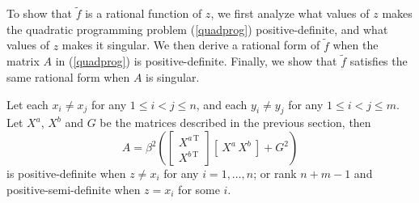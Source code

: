To show that $\tilde f$ is a rational function of $z$, we first analyze
what values of $z$ makes the quadratic programming problem (\ref{quadprog})
positive-definite, and what values of $z$ makes it singular.  We then derive a
rational form of $\tilde f$ when the matrix $A$ in (\ref{quadprog}) is
positive-definite.  Finally, we show that $\tilde f$ satisfies the same
rational form when $A$ is singular.
\begin{lemma} \label{lem_pd}
Let each $x_i \ne x_j$ for any $1\le i < j\le n$, and each $y_i \ne y_j$ for
any $1\le i < j\le m$.  Let
$X^a$, $X^b$ and $G$ be the matrices described in the previous section, then
\[ A = \beta^2 \left(
   \left[\begin{array}{c}X^{a\,\mathrm T}\\X^{b\,\mathrm T}\end{array}\right]
   \left[\: X^a\,X^b \:\right] + G^2 \right) \]
is positive-definite when $z\ne x_i$ for any $i=1,\ldots,n$; or rank $n+m-1$
and positive-semi-definite when $z = x_i$ for some $i$.
\end{lemma}
